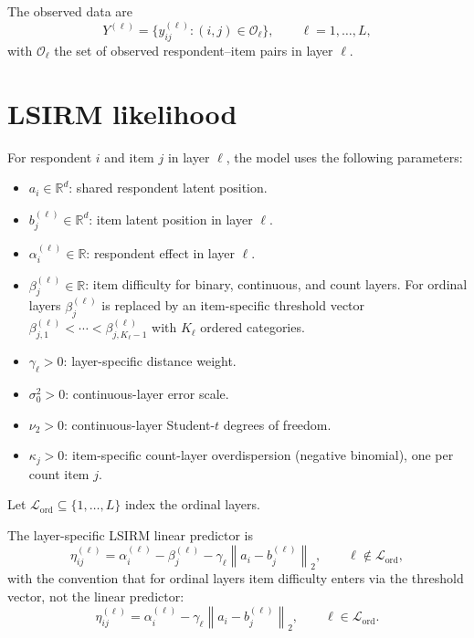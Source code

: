 \documentclass[11pt]{article}
\newcommand{\R}{\mathbb R}
\newcommand{\norm}[1]{\left\lVert #1 \right\rVert}
\begin{document}
The observed data are
\[
    Y^{(\ell)}=\{y_{ij}^{(\ell)}:(i,j)\in\mathcal O_\ell\},
    \qquad \ell=1,\dots,L,
\]
with $\mathcal O_\ell$ the set of observed respondent--item pairs in layer
$\ell$.

\section{LSIRM likelihood}

For respondent $i$ and item $j$ in layer $\ell$, the model uses the
following parameters:
\begin{itemize}[leftmargin=1.5em]
    \item $a_i\in\R^d$: shared respondent latent position.
    \item $b_j^{(\ell)}\in\R^d$: item latent position in layer $\ell$.
    \item $\alpha_i^{(\ell)}\in\R$: respondent effect in layer $\ell$.
    \item $\beta_j^{(\ell)}\in\R$: item difficulty for binary, continuous,
    and count layers.  For ordinal layers $\beta_j^{(\ell)}$ is replaced by
    an item-specific threshold vector
    $\beta_{j,1}^{(\ell)}<\cdots<\beta_{j,K_\ell-1}^{(\ell)}$ with
    $K_\ell$ ordered categories.
    \item $\gamma_\ell>0$: layer-specific distance weight.
    \item $\sigma_0^2>0$: continuous-layer error scale.
    \item $\nu_2>0$: continuous-layer Student-$t$ degrees of freedom.
    \item $\kappa_j>0$: item-specific count-layer overdispersion (negative
    binomial), one per count item $j$.
\end{itemize}
Let $\mathcal L_{\mathrm{ord}}\subseteq\{1,\dots,L\}$ index the ordinal
layers.

The layer-specific LSIRM linear predictor is
\begin{equation}
    \eta_{ij}^{(\ell)}
    =
    \alpha_i^{(\ell)}-\beta_j^{(\ell)}-\gamma_\ell\norm{a_i-b_j^{(\ell)}}_2,
    \qquad \ell\notin\mathcal L_{\mathrm{ord}},
    \label{eq:lsirm-eta}
\end{equation}
with the convention that for ordinal layers item difficulty enters via the
threshold vector, not the linear predictor:
\begin{equation}
    \eta_{ij}^{(\ell)}
    =
    \alpha_i^{(\ell)}-\gamma_\ell\norm{a_i-b_j^{(\ell)}}_2,
    \qquad \ell\in\mathcal L_{\mathrm{ord}}.
    \label{eq:lsirm-eta-ord}
\end{equation}
\end{document}
